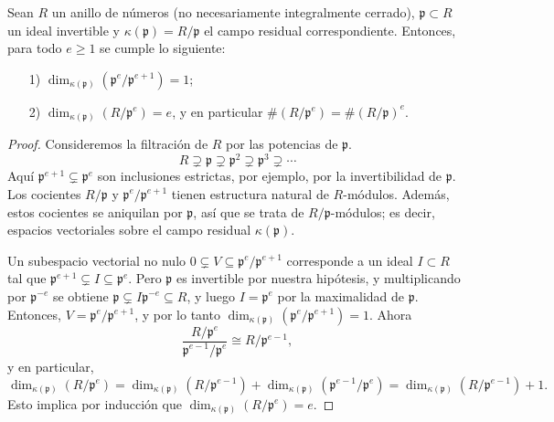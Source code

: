 \begin{lema}
  Sean $R$ un anillo de números (no necesariamente integralmente cerrado),
  $\mathfrak{p} \subset R$ un ideal invertible y
  $\kappa (\mathfrak{p}) = R/\mathfrak{p}$ el campo residual correspondiente.
  Entonces, para todo $e \ge 1$ se cumple lo siguiente:
  \begin{enumerate}
  \item[1)] $\dim_{\kappa (\mathfrak{p})} (\mathfrak{p}^e/\mathfrak{p}^{e+1}) = 1$;

  \item[2)] $\dim_{\kappa (\mathfrak{p})} (R/\mathfrak{p}^e) = e$, y en particular
    $\# (R/\mathfrak{p}^e) = \# (R/\mathfrak{p})^e$.
  \end{enumerate}

  \begin{proof}
    Consideremos la filtración de $R$ por las potencias de $\mathfrak{p}$.
    \[ R \supsetneq \mathfrak{p} \supsetneq \mathfrak{p}^2 \supsetneq
       \mathfrak{p}^3 \supsetneq \cdots \]
    Aquí $\mathfrak{p}^{e+1} \subsetneq \mathfrak{p}^e$ son inclusiones
    estrictas, por ejemplo, por la invertibilidad de $\mathfrak{p}$.  Los
    cocientes $R/\mathfrak{p}$ y $\mathfrak{p}^e/\mathfrak{p}^{e+1}$ tienen
    estructura natural de $R$-módulos. Además, estos cocientes se aniquilan por
    $\mathfrak{p}$, así que se trata de $R/\mathfrak{p}$-módulos; es decir,
    espacios vectoriales sobre el campo residual $\kappa (\mathfrak{p})$.

    Un subespacio vectorial no nulo
    $0 \subsetneq V \subseteq \mathfrak{p}^e/\mathfrak{p}^{e+1}$
    corresponde a un ideal $I \subset R$ tal que
    $\mathfrak{p}^{e+1} \subsetneq I \subseteq \mathfrak{p}^e$. Pero
    $\mathfrak{p}$ es invertible por nuestra hipótesis, y multiplicando por
    $\mathfrak{p}^{-e}$ se obtiene
    $\mathfrak{p} \subsetneq I \mathfrak{p}^{-e} \subseteq R$, y luego
    $I = \mathfrak{p}^e$ por la maximalidad de $\mathfrak{p}$. Entonces,
    $V = \mathfrak{p}^e/\mathfrak{p}^{e+1}$, y por lo tanto
    $\dim_{\kappa (\mathfrak{p})} (\mathfrak{p}^e/\mathfrak{p}^{e+1}) = 1$.
    Ahora
    \[ \frac{R/\mathfrak{p}^e}{\mathfrak{p}^{e-1}/\mathfrak{p}^e} \cong
    R/\mathfrak{p}^{e-1}, \]
    y en particular,
    \[ \dim_{\kappa (\mathfrak{p})} (R/\mathfrak{p}^e) =
       \dim_{\kappa (\mathfrak{p})} (R/\mathfrak{p}^{e-1}) +
       \dim_{\kappa (\mathfrak{p})} (\mathfrak{p}^{e-1}/\mathfrak{p}^e) =
       \dim_{\kappa (\mathfrak{p})} (R/\mathfrak{p}^{e-1}) + 1. \]
    Esto implica por inducción que
    $\dim_{\kappa (\mathfrak{p})} (R/\mathfrak{p}^e) = e$.
  \end{proof}
\end{lema}


